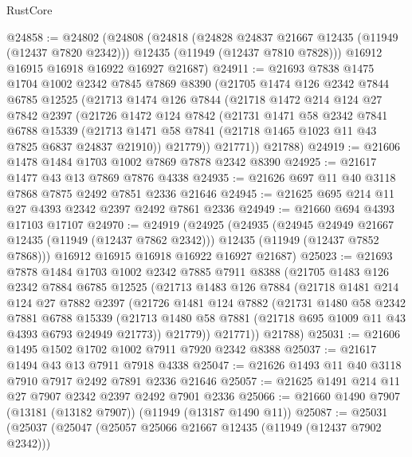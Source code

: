 \begin{lexlean}{RustCore}
\begin{coremodule}
@24858 := @24802
    (@24808
      (@24818
        (@24828 @24837 @21667 @12435 (@11949 (@12437 @7820 @2342)))
        @12435
        (@11949 (@12437 @7810 @7828)))
      @16912
      @16915
      @16918
      @16922
      @16927
      @21687)
@24911 := @21693
    @7838
    @1475
    @1704
    @1002
    @2342
    @7845
    @7869
    @8390
    (@21705
      @1474
      @126
      @2342
      @7844
      @6785
      @12525
      (@21713
        @1474
        @126
        @7844
        (@21718
          @1472
          @214
          @124
          @27
          @7842
          @2397
          (@21726
            @1472
            @124
            @7842
            (@21731
              @1471
              @58
              @2342
              @7841
              @6788
              @15339
              (@21713 @1471 @58 @7841 (@21718 @1465 @1023 @11 @43 @7825 @6837 @24837 @21910))
              @21779))
          @21771))
      @21788)
@24919 := @21606 @1478 @1484 @1703 @1002 @7869 @7878 @2342 @8390
@24925 := @21617 @1477 @43 @13 @7869 @7876 @4338
@24935 := @21626 @697 @11 @40 @3118 @7868 @7875 @2492 @7851 @2336 @21646
@24945 := @21625 @695 @214 @11 @27 @4393 @2342 @2397 @2492 @7861 @2336
@24949 := @21660 @694 @4393 @17103 @17107
@24970 := @24919
    (@24925
      (@24935
        (@24945 @24949 @21667 @12435 (@11949 (@12437 @7862 @2342)))
        @12435
        (@11949 (@12437 @7852 @7868)))
      @16912
      @16915
      @16918
      @16922
      @16927
      @21687)
@25023 := @21693
    @7878
    @1484
    @1703
    @1002
    @2342
    @7885
    @7911
    @8388
    (@21705
      @1483
      @126
      @2342
      @7884
      @6785
      @12525
      (@21713
        @1483
        @126
        @7884
        (@21718
          @1481
          @214
          @124
          @27
          @7882
          @2397
          (@21726
            @1481
            @124
            @7882
            (@21731
              @1480
              @58
              @2342
              @7881
              @6788
              @15339
              (@21713 @1480 @58 @7881 (@21718 @695 @1009 @11 @43 @4393 @6793 @24949 @21773))
              @21779))
          @21771))
      @21788)
@25031 := @21606 @1495 @1502 @1702 @1002 @7911 @7920 @2342 @8388
@25037 := @21617 @1494 @43 @13 @7911 @7918 @4338
@25047 := @21626 @1493 @11 @40 @3118 @7910 @7917 @2492 @7891 @2336 @21646
@25057 := @21625 @1491 @214 @11 @27 @7907 @2342 @2397 @2492 @7901 @2336
@25066 := @21660 @1490 @7907 (@13181 (@13182 @7907)) (@11949 (@13187 @1490 @11))
@25087 := @25031
    (@25037
      (@25047
        (@25057 @25066 @21667 @12435 (@11949 (@12437 @7902 @2342)))

\end{coremodule}
\end{lexlean}
